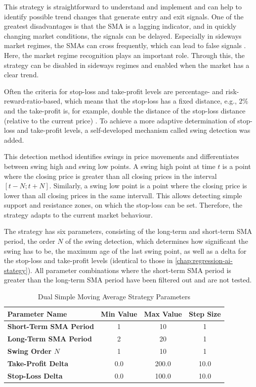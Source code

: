 \noindent
This strategy is straightforward to understand and implement and can help to identify possible trend changes that generate entry and exit signals.
One of the greatest disadvantages is that the SMA is a lagging indicator, and in quickly changing market conditions, the signals can be delayed.
Especially in sideways market regimes, the SMAs can cross frequently, which can lead to false signals \cite{sma-advantage-disadvantage}.
Here, the market regime recognition plays an important role.
Through this, the strategy can be disabled in sideways regimes and enabled when the market has a clear trend.

Often the criteria for stop-loss and take-profit levels are percentage- and risk-reward-ratio-based, which means that the stop-loss has a fixed distance, e.g., 2\% and the take-profit is, for example, double the distance of the stop-loss distance (relative to the current price) \cite{sma-sl-tp}.
To achieve a more adaptive determination of stop-loss and take-profit levels, a self-developed mechanism called swing detection was added.

This detection method identifies swings in price movements and differentiates between swing high and swing low points.
A swing high point at time $t$ is a point where the closing price is greater than all closing prices in the interval $[t-N; t+N]$.
Similarly, a swing low point is a point where the closing price is lower than all closing prices in the same intervall.
This allows detecting simple support and resistance zones, on which the stop-loss can be set.
Therefore, the strategy adapts to the current market behaviour.

The strategy has six parameters, consisting of the long-term and short-term SMA period, the order $N$ of the swing detection, which determines how significant the swing has to be, the maximum age of the last swing point, as well as a delta for the stop-loss and take-profit levels (identical to those in \autoref{chap:regression-ai-stategy}).
All parameter combinations where the short-term SMA period is greater than the long-term SMA period have been filtered out and are not tested.

\begin{table}[H]
    \centering
    \begin{tabular}{L{4cm}ccc}
        \toprule
        \textbf{Parameter Name} & Min Value & Max Value & Step Size
        \\
        \midrule
        \textbf{Short-Term SMA Period} & 1   & 10    & 1    \\
        \textbf{Long-Term SMA Period}  & 2   & 20    & 1    \\
        \textbf{Swing Order $N$}       & 1   & 10    & 1    \\
        \textbf{Take-Profit Delta}     & 0.0 & 200.0 & 10.0 \\
        \textbf{Stop-Loss Delta}       & 0.0 & 100.0 & 10.0 \\
        \bottomrule
    \end{tabular}
    \caption{Dual Simple Moving Average Strategy Parameters}
    \label{tbl:sma-strategy-parameters}
\end{table}

